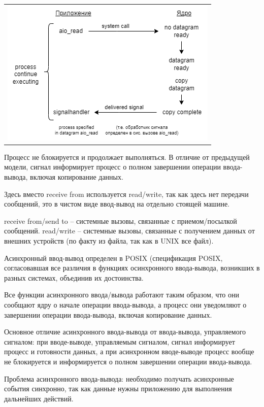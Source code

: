 \begin{table}[H]
  \centering
  \begin{tabular}{p{1\linewidth}}
    \centering
    \includegraphics[width=0.8\linewidth]{./images/1-5.png}
  \end{tabular}
\end{table}

Процесс не блокируется и продолжает выполняться. В отличие от предыдущей модели, сигнал информирует процесс о полном завершении операции ввода-вывода, включая копирование данных. 

Здесь вместо receive from используется read/write, так как здесь нет передачи сообщений, это в чистом виде ввод-вывод на отдельно стоящей машине. 

receive from/send to – системные вызовы, связанные с приемом/посылкой сообщений.
read/write – системные вызовы, связанные с получением данных от внешних устройств (по факту из файла, так как в UNIX все файл).

Асинхронный ввод-вывод определен в POSIX (спецификация POSIX, согласовавшая все различия в функциях осинхронного ввода-вывода, возникших в разных системах, объединив их достоинства.

Все функции асинхронного ввода/вывода работают таким образом, что они сообщают ядру о начале операции ввода-вывода, а процесс они уведомляют о завершении операции ввода-вывода, включая копирование данных.

Основное отличие асинхронного ввода-вывода от ввода-вывода, управляемого сигналом: при вводе-выводе, управляемым сигналом, сигнал информирует процесс и готовности данных, а при асинхронном вводе-выводе процесс вообще не блокируется и информируется о полном завершении операции ввода-вывода.

Проблема асинхронного ввода-вывода: необходимо получать асинхронные события синхронно, так как данные нужны приложению для выполнения дальнейших действий.

